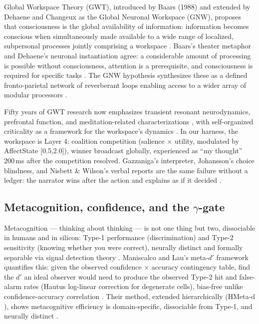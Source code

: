 \documentclass[11pt]{article}
\begin{document}
Global Workspace Theory (GWT), introduced by Baars (1988) and extended by Dehaene and Changeux as the Global Neuronal Workspace (GNW), proposes that consciousness is the global availability of information: information becomes conscious when simultaneously made available to a wide range of localized, subpersonal processes jointly comprising a workspace \citep{baars1997,atallah2026gwt}. Baars's theater metaphor and Dehaene's neuronal instantiation agree: a considerable amount of processing is possible without consciousness, attention is a prerequisite, and consciousness is required for specific tasks \citep{baars1997,atallah2026gwt}. The GNW hypothesis synthesizes these as a defined fronto-parietal network of reverberant loops enabling access to a wider array of modular processors \citep{atallah2026gwt}.

Fifty years of GWT research now emphasizes transient resonant neurodynamics, prefrontal function, and meditation-related characterizations \citep{baars1997}, with self-organized criticality as a framework for the workspace's dynamics \citep{baars1997}. In our harness, the workspace is Layer 4: coalition competition (salience $\times$ utility, modulated by AffectState [0.5,2.0]), winner broadcast globally, experienced as ``my thought'' 200\,ms after the competition resolved. Gazzaniga's interpreter, Johansson's choice blindness, and Nisbett \& Wilson's verbal reports are the same failure without a ledger: the narrator wins after the action and explains as if it decided \citep{gazzaniga2000,johansson2005,nisbett1977}.

\subsection{Metacognition, confidence, and the $\gamma$-gate}

Metacognition --- thinking about thinking --- is not one thing but two, dissociable in humans and in silicon: Type-1 performance (discrimination) and Type-2 sensitivity (knowing whether you were correct), neurally distinct and formally separable via signal detection theory \citep{cacioli2026,maniscalco2012}. Maniscalco and Lau's meta-$d'$ framework quantifies this: given the observed confidence $\times$ accuracy contingency table, find the $d'$ an ideal observer would need to produce the observed Type-2 hit and false-alarm rates (Hautus log-linear correction for degenerate cells), bias-free unlike confidence-accuracy correlation \citep{maniscalco2012,cacioli2026}. Their method, extended hierarchically (HMeta-d \citep{maniscalco2012}), shows metacognitive efficiency is domain-specific, dissociable from Type-1, and neurally distinct \citep{cacioli2026}.
\end{document}
